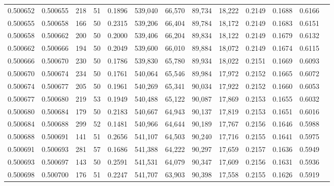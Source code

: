 \begin{tabular}{rrrrrrrrrrrrr}
0.500652 & 0.500655 & 218 &  51 &                                     0.1896 & 539,040 &  66,570 &  89,734 &  18,222 & 0.2149 & 0.1688 & 0.6166 \\
0.500655 & 0.500658 & 166 &  50 &                                     0.2315 & 539,206 &  66,404 &  89,784 &  18,172 & 0.2149 & 0.1683 & 0.6151 \\
0.500658 & 0.500662 & 200 &  50 &                                     0.2000 & 539,406 &  66,204 &  89,834 &  18,122 & 0.2149 & 0.1679 & 0.6132 \\
0.500662 & 0.500666 & 194 &  50 &                                     0.2049 & 539,600 &  66,010 &  89,884 &  18,072 & 0.2149 & 0.1674 & 0.6115 \\
0.500666 & 0.500670 & 230 &  50 &                                     0.1786 & 539,830 &  65,780 &  89,934 &  18,022 & 0.2151 & 0.1669 & 0.6093 \\
0.500670 & 0.500674 & 234 &  50 &                                     0.1761 & 540,064 &  65,546 &  89,984 &  17,972 & 0.2152 & 0.1665 & 0.6072 \\
0.500674 & 0.500677 & 205 &  50 &                                     0.1961 & 540,269 &  65,341 &  90,034 &  17,922 & 0.2152 & 0.1660 & 0.6053 \\
0.500677 & 0.500680 & 219 &  53 &                                     0.1949 & 540,488 &  65,122 &  90,087 &  17,869 & 0.2153 & 0.1655 & 0.6032 \\
0.500680 & 0.500684 & 179 &  50 &                                     0.2183 & 540,667 &  64,943 &  90,137 &  17,819 & 0.2153 & 0.1651 & 0.6016 \\
0.500684 & 0.500688 & 299 &  52 &                                     0.1481 & 540,966 &  64,644 &  90,189 &  17,767 & 0.2156 & 0.1646 & 0.5988 \\
0.500688 & 0.500691 & 141 &  51 &                                     0.2656 & 541,107 &  64,503 &  90,240 &  17,716 & 0.2155 & 0.1641 & 0.5975 \\
0.500691 & 0.500693 & 281 &  57 &                                     0.1686 & 541,388 &  64,222 &  90,297 &  17,659 & 0.2157 & 0.1636 & 0.5949 \\
0.500693 & 0.500697 & 143 &  50 &                                     0.2591 & 541,531 &  64,079 &  90,347 &  17,609 & 0.2156 & 0.1631 & 0.5936 \\
0.500698 & 0.500700 & 176 &  51 &                                     0.2247 & 541,707 &  63,903 &  90,398 &  17,558 & 0.2155 & 0.1626 & 0.5919 \\

\end{tabular}
